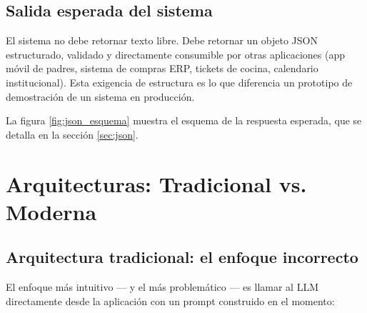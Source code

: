 \documentclass[12pt,a4paper]{article}
\begin{document}
\subsection{Salida esperada del sistema}

El sistema no debe retornar texto libre. Debe retornar un objeto JSON
estructurado, validado y directamente consumible por otras aplicaciones
(app móvil de padres, sistema de compras ERP, tickets de cocina, calendario
institucional). Esta exigencia de estructura es lo que diferencia un prototipo
de demostración de un sistema en producción.

La figura \ref{fig:json_esquema} muestra el esquema de la respuesta esperada,
que se detalla en la sección \ref{sec:json}.

\section{Arquitecturas: Tradicional vs. Moderna}
\label{sec:arquitecturas}

\subsection{Arquitectura tradicional: el enfoque incorrecto}

El enfoque más intuitivo --- y el más problemático --- es llamar al LLM
directamente desde la aplicación con un prompt construido en el momento:
\end{document}
